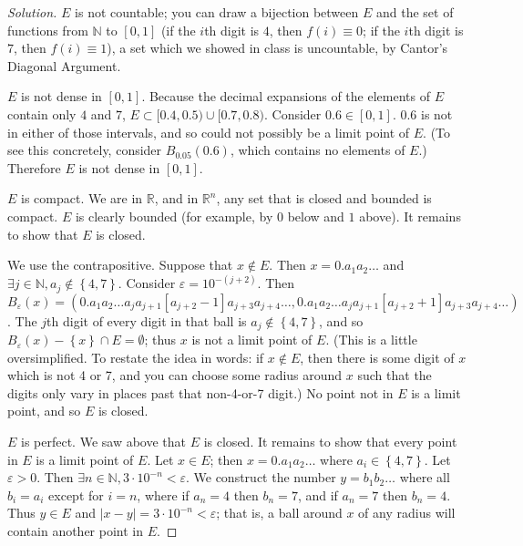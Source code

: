 \documentclass{article}
\newcommand{\R}{\mathbb{R}}
\newcommand{\N}{\mathbb{N}}
\newcommand{\abs}[1]{\left| #1 \right|}
\newcommand{\set}[1]{\left\{ #1 \right\}}
\begin{document}
\begin{proof}[Solution]
    $E$ is not countable; you can draw a bijection between $E$ and the set of functions from $\N$ to $[0, 1]$ (if the $i$th digit is $4$, then $f(i) \equiv 0$; if the $i$th digit is $7$, then $f(i) \equiv 1$), a set which we showed in class is uncountable, by Cantor's Diagonal Argument.

    $E$ is not dense in $[0, 1]$. Because the decimal expansions of the elements of $E$ contain only $4$ and $7$, $E \subset [0.4, 0.5) \cup [0.7, 0.8)$. Consider $0.6 \in [0, 1]$. $0.6$ is not in either of those intervals, and so could not possibly be a limit point of $E$. (To see this concretely, consider $B_{0.05}(0.6)$, which contains no elements of $E$.) Therefore $E$ is not dense in $[0, 1]$.

    $E$ is compact. We are in $\R$, and in $\R^n$, any set that is closed and bounded is compact. $E$ is clearly bounded (for example, by $0$ below and $1$ above). It remains to show that $E$ is closed.
    
    We use the contrapositive. Suppose that $x \notin E$. Then $x = 0.a_1 a_2 \dots$ and $\exists j \in \N, a_j \notin \set{4, 7}$. Consider $\varepsilon = 10^{-(j + 2)}$. Then $B_\varepsilon(x) = (0.a_1 a_2 \dots a_j a_{j + 1}[a_{j+ 2} - 1] a_{j + 3} a_{j + 4} \dots, 0.a_1 a_2 \dots a_j a_{j + 1} [a_{j + 2} + 1] a_{j + 3} a_{j + 4} \dots)$. The $j$th digit of every digit in that ball is $a_j \notin \set{4, 7}$, and so $B_\varepsilon(x) - \set{x} \cap E = \emptyset$; thus $x$ is not a limit point of $E$. (This is a little oversimplified. To restate the idea in words: if $x \notin E$, then there is some digit of $x$ which is not 4 or 7, and you can choose some radius around $x$ such that the digits only vary in places past that non-4-or-7 digit.) No point not in $E$ is a limit point, and so $E$ is closed.

    $E$ is perfect. We saw above that $E$ is closed. It remains to show that every point in $E$ is a limit point of $E$. Let $x \in E$; then $x = 0.a_1 a_2 \dots$ where $a_i \in \set{4, 7}$. Let $\varepsilon > 0$. Then $\exists n \in \N, 3 \cdot 10^{-n} < \varepsilon$. We construct the number $y = b_1 b_2 \dots$ where all $b_i = a_i$ except for $i = n$, where if $a_n = 4$ then $b_n = 7$, and if $a_n = 7$ then $b_n = 4$. Thus $y \in E$ and $\abs{x - y} = 3 \cdot 10^{-n} < \varepsilon$; that is, a ball around $x$ of any radius will contain another point in $E$.


    
\end{proof}
\end{document}
